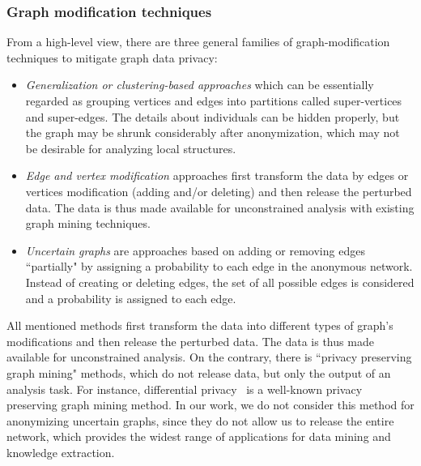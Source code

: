 \subsubsection{Graph modification techniques}
From a high-level view, there are three general families of graph-modification techniques to mitigate graph data privacy: 

\begin{itemize}
    \item {\em Generalization or clustering-based approaches} which can be essentially regarded as grouping vertices and edges into partitions called super-vertices and super-edges. The details about individuals can be hidden properly, but the graph may be shrunk considerably after anonymization, which may not be desirable for analyzing local structures. 
    \item {\em Edge and vertex modification} approaches first transform the data by edges or vertices modification (adding and/or deleting) and then release the perturbed data. The data is thus made available for unconstrained analysis with existing graph mining techniques. 
    \item {\em Uncertain graphs} are approaches based on adding or removing edges ``partially" by assigning a probability to each edge in the anonymous network. Instead of creating or deleting edges, the set of all possible edges is considered and a probability is assigned to each edge. 
\end{itemize}

All mentioned methods first transform the data into different types of graph's modifications and then release the perturbed data. The data is thus made available for unconstrained analysis. On the contrary, there is ``privacy preserving graph mining" methods, which do not release data, but only the output of an analysis task. For instance, differential privacy~\cite{Jorgensen2016} is a well-known privacy preserving graph mining method. In our work, we do not consider this method for anonymizing uncertain graphs, since they do not allow us to release the entire network, which provides the widest range of applications for data mining and knowledge extraction. 

